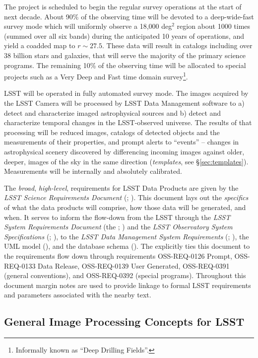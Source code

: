 \documentclass[SE,lsstdraft,toc]{lsstdoc}
\begin{document}
The project is scheduled to  begin the regular survey operations at the start of next decade. About 90\% of the observing time will be devoted to a deep-wide-fast survey mode which will uniformly observe a 18,000 deg$^2$ region about 1000 times (summed over all six bands) during the anticipated 10 years of operations, and yield a coadded map to $r\sim27.5$. These data will result in catalogs including over $38$ billion stars and galaxies, that will serve the majority of the primary science programs. The remaining 10\% of the observing time will be allocated to special projects such as a Very Deep and Fast time domain survey\footnote{Informally known as ``Deep Drilling Fields''.}.

LSST will be operated in fully automated survey mode. The images acquired by the LSST Camera will be processed by LSST Data Management software to a) detect and characterize imaged astrophysical sources and b) detect and characterize temporal changes in the LSST-observed universe. The results of that processing will be reduced images, catalogs of detected objects and the measurements of their properties, and prompt alerts to ``events'' -- changes in astrophysical scenery discovered by differencing incoming images against older, deeper, images of the sky in the same direction (\emph{templates}, see \S \ref{sec:templates}). Measurements will be internally and absolutely calibrated.

The \emph{broad}, \emph{high-level}, requirements for LSST Data Products are given by the \emph{LSST Science Requirements Document} (\SRD; ). This document lays out the \emph{specifics} of what the data products will comprise, how those data will be generated, and when. It serves to inform the flow-down from the LSST \SRD through the \emph{LSST System Requirements Document} (the \LSR; ) and the \emph{LSST Observatory System Specifications} (\OSS; ), to the \emph{LSST Data Management System Requirements} (\DMSR; ), the UML model (\appsUMLdomain), and the database schema ().
The \OSS explicitly ties this document to the requirements flow down through requirements OSS-REQ-0126 Prompt, OSS-REQ-0133 Data Release, OSS-REQ-0139 User Generated, OSS-REQ-0391 (general conventions), and OSS-REQ-0392 (special programs).
Throughout this document margin notes are used to provide linkage to formal LSST requirements and parameters associated with the nearby text.

\subsection{General Image Processing Concepts for LSST}
\end{document}
